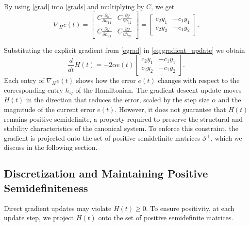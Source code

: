 \documentclass[reqno]{amsart}
\numberwithin{equation}{section}
\begin{document}
By using \eqref{grad} into \eqref{grads} and multiplying by $C$, we get
\begin{equation} \label{egrad}
\nabla_H e(t) =
\begin{bmatrix}
C \frac{\partial y}{\partial h_{11}} & C \frac{\partial y}{\partial h_{12}} \\
C \frac{\partial y}{\partial h_{21}} & C \frac{\partial y}{\partial h_{22}}
\end{bmatrix} =
\begin{bmatrix}
 c_2 y_1 & -c_1 y_1 \\
 c_2 y_2 & -c_1 y_2
\end{bmatrix}.
\end{equation}
 
Substituting the explicit gradient from \eqref{egrad} in \eqref{eq:gradient_update} we obtain
\begin{equation}
\frac{d}{dt} H(t) =
-2 \alpha e(t) 
\begin{bmatrix}
 c_2 y_1 & -c_1 y_1 \\
 c_2 y_2 & -c_1 y_2
\end{bmatrix}.
\end{equation} Each entry of $\nabla_H e(t)$ shows how the error $e(t)$ changes with respect to the corresponding entry $h_{ij}$ of the Hamiltonian. The gradient descent update moves $H(t)$ in the direction that reduces the error, scaled by the step size $\alpha$ and the magnitude of the current error $e(t)$.  However, it does not guarantee that $H(t)$ remains positive semidefinite, a property required to preserve the structural and stability characteristics of the canonical system. To enforce this constraint, the gradient is projected onto the set of positive semidefinite matrices $\mathcal{S}^+$, which we discuss in the following section.
 

 
\subsection{Discretization and Maintaining Positive Semidefiniteness}


Direct gradient updates may violate \(H(t) \geq 0\). To ensure positivity, at each update step, we project \(H(t)\) onto the set of  positive semidefinite  matrices.\\
\end{document}
